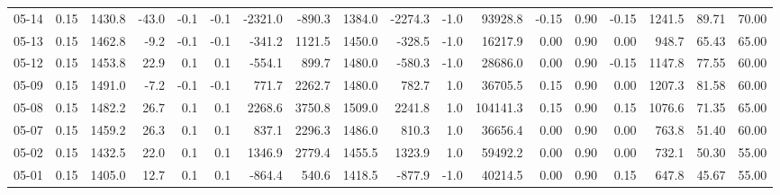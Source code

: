 \begin{threeparttable}
{\begin{tabular}{lrrrrrrrrrrrrrrrrr}
  05-14 &     0.15 & 1430.8 &             -43.0 &              -0.1 &               -0.1 &            -2321.0 &  -890.3 & 1384.0 &    -2274.3 &                     -1.0 &             93928.8 &      -0.15 &      0.90 &          -0.15 &           1241.5 &           89.71 &                  70.00 \\
  05-13 &     0.15 & 1462.8 &              -9.2 &              -0.1 &               -0.1 &             -341.2 &  1121.5 & 1450.0 &     -328.5 &                     -1.0 &             16217.9 &       0.00 &      0.90 &           0.00 &            948.7 &           65.43 &                  65.00 \\
  05-12 &     0.15 & 1453.8 &              22.9 &               0.1 &                0.1 &             -554.1 &   899.7 & 1480.0 &     -580.3 &                     -1.0 &             28686.0 &       0.00 &      0.90 &          -0.15 &           1147.8 &           77.55 &                  60.00 \\
  05-09 &     0.15 & 1491.0 &              -7.2 &              -0.1 &               -0.1 &              771.7 &  2262.7 & 1480.0 &      782.7 &                      1.0 &             36705.5 &       0.15 &      0.90 &           0.00 &           1207.3 &           81.58 &                  60.00 \\
  05-08 &     0.15 & 1482.2 &              26.7 &               0.1 &                0.1 &             2268.6 &  3750.8 & 1509.0 &     2241.8 &                      1.0 &            104141.3 &       0.15 &      0.90 &           0.15 &           1076.6 &           71.35 &                  65.00 \\
  05-07 &     0.15 & 1459.2 &              26.3 &               0.1 &                0.1 &              837.1 &  2296.3 & 1486.0 &      810.3 &                      1.0 &             36656.4 &       0.00 &      0.90 &           0.00 &            763.8 &           51.40 &                  60.00 \\
  05-02 &     0.15 & 1432.5 &              22.0 &               0.1 &                0.1 &             1346.9 &  2779.4 & 1455.5 &     1323.9 &                      1.0 &             59492.2 &       0.00 &      0.90 &           0.00 &            732.1 &           50.30 &                  55.00 \\
  05-01 &     0.15 & 1405.0 &              12.7 &               0.1 &                0.1 &             -864.4 &   540.6 & 1418.5 &     -877.9 &                     -1.0 &             40214.5 &       0.00 &      0.90 &           0.15 &            647.8 &           45.67 &                  55.00 \\

\end{tabular}}
\end{threeparttable}
